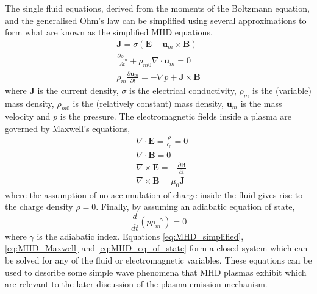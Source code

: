 The single fluid equations, derived from the moments of the Boltzmann equation, and the generalised Ohm's law can be simplified using several approximations to form what are known as the simplified MHD equations.
\begin{subequations} \label{eq:MHD_simplified}
\begin{align}
\mathbf{J} = \sigma(\mathbf{E} + \mathbf{u}_m \times \mathbf{B}) \\
\frac{\partial \rho_m}{\partial t} + \rho_{m0} \nabla \cdot \mathbf{u}_m = 0 \\
\rho_m \frac{\partial \mathbf{u}_m}{\partial t} = - \nabla p + \mathbf{J} \times \mathbf{B}
\end{align}
\end{subequations}
where $\mathbf{J}$ is the current density, $\sigma$ is the electrical conductivity, $\rho_m$ is the (variable) mass density, $\rho_{m0}$ is the (relatively constant) mass density,  $\mathbf{u}_m$ is the mass velocity and $p$ is the pressure.
The electromagnetic fields inside a plasma are governed by Maxwell's equations,
\begin{subequations} \label{eq:MHD_Maxwell}
\begin{align}
& \nabla \cdot \mathbf{E} = \frac{\rho}{\epsilon_0} = 0 \\
& \nabla \cdot \mathbf{B} = 0 \\
& \nabla \times \mathbf{E} = - \frac{\partial \mathbf{B}}{\partial t} \\
& \nabla \times \mathbf{B} = \mu_0 \mathbf{J}
\end{align}
\end{subequations}
where the assumption of no accumulation of charge inside the fluid gives rise to the charge density $\rho = 0$. Finally, by assuming an adiabatic equation of state,
\begin{equation}
\label{eq:MHD_eq_of_state}
\frac{d}{dt} \left(p \rho_m^{-\gamma} \right) = 0
\end{equation}
where $\gamma $ is the adiabatic index.
Equations \ref{eq:MHD_simplified}, \ref{eq:MHD_Maxwell} and \ref{eq:MHD_eq_of_state} form a closed system which can be solved for any of the fluid or electromagnetic variables. These equations can be used to describe some simple wave phenomena that MHD plasmas exhibit which are relevant to the later discussion of the plasma emission mechanism.
